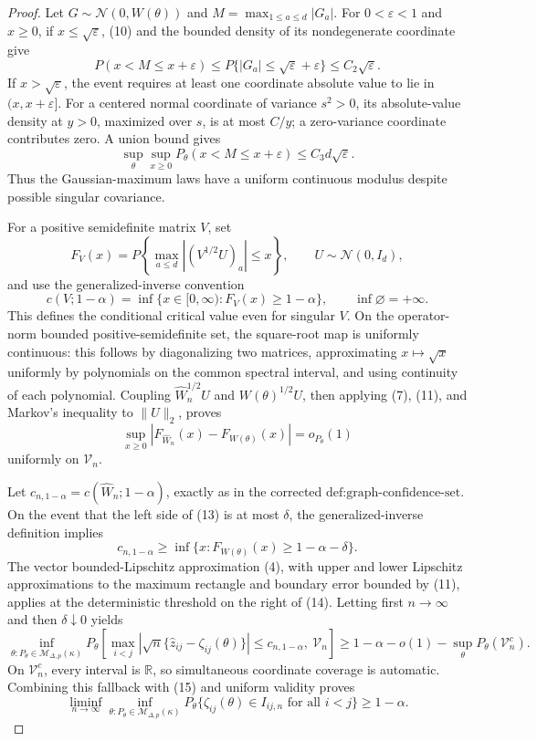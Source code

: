 \documentclass{article}
\begin{document}
\begin{proof}
Let \(G\sim\mathcal N(0,W(\theta))\) and \(M=\max_{1\leq a\leq d}|G_a|\).  For \(0<\varepsilon<1\) and \(x\geq0\), if \(x\leq\sqrt\varepsilon\), (10) and the bounded density of its nondegenerate coordinate give
\[
 P(x<M\leq x+\varepsilon)
 \leq P\{|G_a|\leq\sqrt\varepsilon+\varepsilon\}
 \leq C_2\sqrt\varepsilon.
\]
If \(x>\sqrt\varepsilon\), the event requires at least one coordinate absolute value to lie in \((x,x+\varepsilon]\).  For a centered normal coordinate of variance \(s^2>0\), its absolute-value density at \(y>0\), maximized over \(s\), is at most \(C/y\); a zero-variance coordinate contributes zero.  A union bound gives
\[
 \sup_{\theta}\sup_{x\geq0}P_\theta(x<M\leq x+\varepsilon)
 \leq C_3d\sqrt\varepsilon.
\tag{11}
\]
Thus the Gaussian-maximum laws have a uniform continuous modulus despite possible singular covariance.

For a positive semidefinite matrix \(V\), set
\[
 F_V(x)=P\!\left\{\max_{a\leq d}|(V^{1/2}U)_a|\leq x\right\},
 \qquad U\sim\mathcal N(0,I_d),
\]
and use the generalized-inverse convention
\[
 c(V;1-\alpha)=\inf\{x\in[0,\infty):F_V(x)\geq1-\alpha\},
 \qquad \inf\varnothing=+\infty.
\tag{12}
\]
This defines the conditional critical value even for singular \(V\).  On the operator-norm bounded positive-semidefinite set, the square-root map is uniformly continuous: this follows by diagonalizing two matrices, approximating \(x\mapsto\sqrt x\) uniformly by polynomials on the common spectral interval, and using continuity of each polynomial.  Coupling \(\widehat W_n^{1/2}U\) and \(W(\theta)^{1/2}U\), then applying (7), (11), and Markov's inequality to \(\lVert U\rVert_2\), proves
\[
 \sup_{x\geq0}|F_{\widehat W_n}(x)-F_{W(\theta)}(x)|=o_{P_\theta}(1)
\tag{13}
\]
uniformly on \(\mathcal V_n\).

Let \(c_{n,1-\alpha}=c(\widehat W_n;1-\alpha)\), exactly as in the corrected \(\text{def:graph-confidence-set}\).  On the event that the left side of (13) is at most \(\delta\), the generalized-inverse definition implies
\[
 c_{n,1-\alpha}\geq
 \inf\{x:F_{W(\theta)}(x)\geq1-\alpha-\delta\}.
\tag{14}
\]
The vector bounded-Lipschitz approximation (4), with upper and lower Lipschitz approximations to the maximum rectangle and boundary error bounded by (11), applies at the deterministic threshold on the right of (14).  Letting first \(n\to\infty\) and then \(\delta\downarrow0\) yields
\[
 \inf_{\theta:P_\theta\in\mathcal M_{\Delta,p}(\kappa)}
 P_\theta\!\left[
 \max_{i<j}\left|\sqrt n\{\widehat z_{ij}-\zeta_{ij}(\theta)\}\right|
 \leq c_{n,1-\alpha},\ \mathcal V_n\right]
 \geq1-\alpha-o(1)-\sup_\theta P_\theta(\mathcal V_n^c).
\tag{15}
\]
On \(\mathcal V_n^c\), every interval is \(\mathbb R\), so simultaneous coordinate coverage is automatic.  Combining this fallback with (15) and uniform validity proves
\[
 \liminf_{n\to\infty}\inf_{\theta:P_\theta\in\mathcal M_{\Delta,p}(\kappa)}
 P_\theta\{\zeta_{ij}(\theta)\in I_{ij,n}\text{ for all }i<j\}
 \geq1-\alpha.
\tag{16}
\]


\end{proof}
\end{document}
